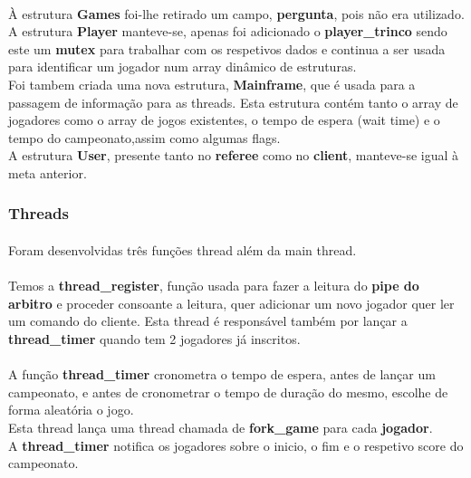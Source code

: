 \documentclass[letterpaper, 11pt]{article}
\begin{document}
\paragraph{}
À estrutura \textbf{Games} foi-lhe retirado um campo, \textbf{pergunta}, pois não era utilizado.\\
A estrutura \textbf{Player} manteve-se, apenas foi adicionado o \textbf{player\_trinco} sendo este um \textbf{mutex} para trabalhar com os respetivos dados e continua a ser usada para identificar um jogador num array dinâmico de estruturas.\\
Foi tambem criada uma nova estrutura, \textbf{Mainframe}, que é usada para a passagem de informação para as threads. Esta estrutura contém tanto o array de jogadores como o array de jogos existentes, o tempo de espera (wait time) e o tempo do campeonato,assim como algumas flags. \\
A estrutura \textbf{User}, presente tanto no \textbf{referee} como no \textbf{client}, manteve-se igual à meta anterior.

\subsubsection{Threads}
\label{sec:orga4bbb22}

\paragraph{}
Foram desenvolvidas três funções thread além da main thread.
\paragraph{}
Temos a \textbf{thread\_register}, função usada para fazer a leitura do \textbf{pipe do arbitro} e proceder consoante a leitura, quer adicionar um novo jogador quer ler um comando do cliente. Esta thread é responsável também por lançar a \textbf{thread\_timer} quando tem 2 jogadores já inscritos.
\paragraph{}
A função \textbf{thread\_timer} cronometra o tempo de espera, antes de lançar um campeonato, e antes de cronometrar o tempo de duração do mesmo, escolhe de forma aleatória o jogo.\\
Esta thread lança uma thread chamada de \textbf{fork\_game} para cada \textbf{jogador}.\\
A \textbf{thread\_timer} notifica os jogadores sobre o inicio, o fim e o respetivo score do campeonato.
\end{document}
